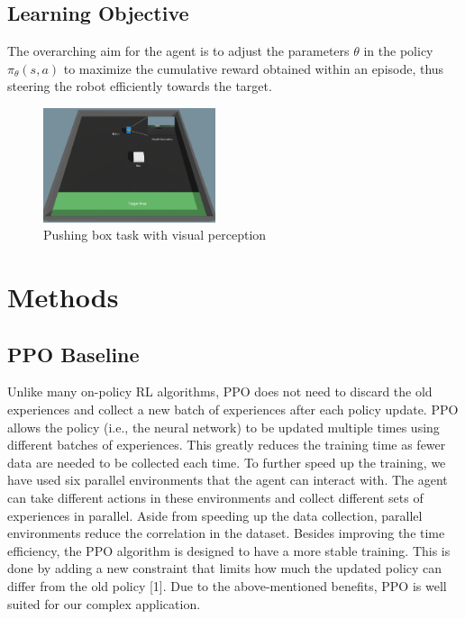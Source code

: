 \documentclass{article}
\newcommand{\chugo}[1]{\todo[color=red!60,inline]{H:#1}}
\begin{document}
\subsection{Learning Objective}
The overarching aim for the agent is to adjust the parameters \( \theta \) in the policy \( \pi_\theta(s,a) \) to maximize the cumulative reward obtained within an episode, thus steering the robot efficiently towards the target.

\begin{figure}[!tb]
\centering
\includegraphics[width=0.45\textwidth]{images/push.png}
\caption{Pushing box task with visual perception}
\end{figure}


\section{Methods}
\label{ref:methods}
\subsection{PPO Baseline}
\label{subsec:ppo}
Unlike many on-policy RL algorithms, PPO does not need to discard the old experiences and collect a new batch of experiences after each policy update. PPO allows the policy (i.e., the neural network) to be updated multiple times using different batches of experiences. This greatly reduces the training time as fewer data are needed to be collected each time. To further speed up the training, we have used six parallel environments that the agent can interact with. The agent can take different actions in these environments and collect different sets of experiences in parallel. Aside from speeding up the data collection, parallel environments reduce the correlation in the dataset. 
Besides improving the time efficiency, the PPO algorithm is designed to have a more stable training. This is done by adding a new constraint that limits how much the updated policy can differ from the old policy [1].
Due to the above-mentioned benefits, PPO is well suited for our complex application. 
\end{document}
